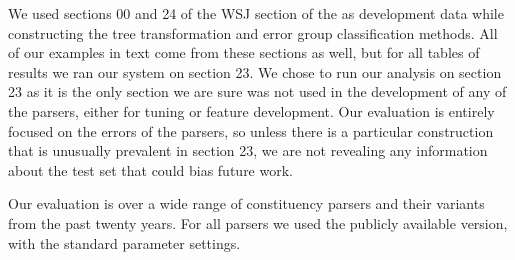 We used sections 00 and 24 of the WSJ section of the \ptb as development data while constructing the tree transformation and error group classification methods.
All of our examples in text come from these sections as well, but for all tables of results we ran our system on section 23.
We chose to run our analysis on section 23 as it is the only section we are sure was not used in the development of any of the parsers, either for tuning or feature development.
Our evaluation is entirely focused on the errors of the parsers, so unless there is a particular construction that is unusually prevalent in section 23, we are not revealing any information about the test set that could bias future work.

Our evaluation is over a wide range of \ptb constituency parsers and their variants from the past twenty years.
For all parsers we used the publicly available version, with the standard parameter settings.

